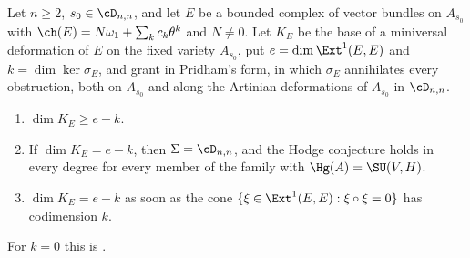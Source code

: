 \begin{proposition}\label{prop:p2flat}
Let $n\ge2$, $s_{0}\in\cD_{n,n}$, and let $E$ be a bounded complex of vector
bundles on $A_{s_{0}}$ with $\ch(E)=N\omega_{1}+\sum_{k}c_{k}\theta^{k}$ and
$N\ne0$. Let $K_{E}$ be the base of a miniversal deformation of $E$ on the
fixed variety $A_{s_{0}}$, put $e=\dim\Ext^{1}(E,E)$ and
$k=\dim\ker\sigma_{E}$, and grant  in Pridham's form, in which
$\sigma_{E}$ annihilates every obstruction, both on $A_{s_{0}}$ and along the
Artinian deformations of $A_{s_{0}}$ in $\cD_{n,n}$.
\begin{enumerate}[label=\textup{(\roman*)},leftmargin=2.6em,itemsep=2pt]
\item $\dim K_{E}\ge e-k$.
\item If $\dim K_{E}=e-k$, then $\Sigma=\cD_{n,n}$, and the Hodge conjecture
  holds in every degree for every member of the family with
  $\Hg(A)=\SU(V,H)$.
\item $\dim K_{E}=e-k$ as soon as the cone
  $\{\xi\in\Ext^{1}(E,E):\xi\circ\xi=0\}$ has codimension $k$.
\end{enumerate}
For $k=0$ this is .
\end{proposition}

